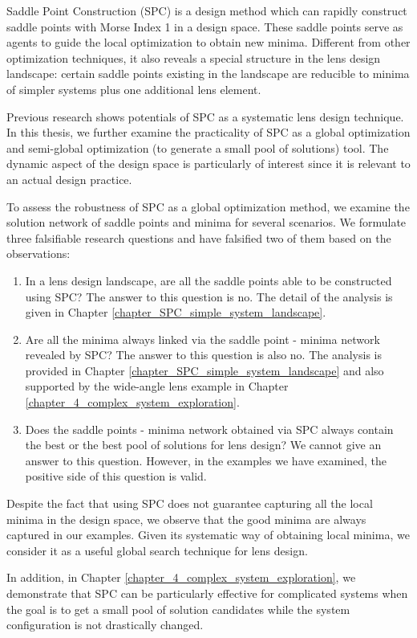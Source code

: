 Saddle Point Construction (SPC) is a design method which can rapidly construct saddle points with Morse Index 1 in a design space. These saddle points serve as agents to guide the local optimization to obtain new minima. Different from other optimization techniques, it also reveals a special structure in the lens design landscape: certain saddle points existing in the landscape are reducible to minima of simpler systems plus one additional lens element.

Previous research shows potentials of SPC as a systematic lens design technique. In this thesis, we further examine the practicality of SPC as a global optimization and semi-global optimization (to generate a small pool of solutions) tool. The dynamic aspect of the design space is particularly of interest since it is relevant to an actual design practice. 

To assess the robustness of SPC as a global optimization method, we examine the solution network of saddle points and minima for several scenarios. We formulate three falsifiable research questions and have falsified two of them based on the observations:
\begin{enumerate}[nosep]
\item In a lens design landscape, are all the saddle points able to be constructed using SPC? The answer to this question is no. The detail of the analysis is given in Chapter \ref{chapter_SPC_simple_system_landscape}.
\item Are all the minima always linked via the saddle point - minima network revealed by SPC? The answer to this question is also no. The analysis is provided in Chapter \ref{chapter_SPC_simple_system_landscape} and also supported by the wide-angle lens example in Chapter \ref{chapter_4_complex_system_exploration}.
\item Does the saddle points - minima network obtained via SPC always contain the best or the best pool of solutions for lens design? We cannot give an answer to this question. However, in the examples we have examined, the positive side of this question is valid. 
\end{enumerate}

Despite the fact that using SPC does not guarantee capturing all the local minima in the design space, we observe that the good minima are always captured in our examples. Given its systematic way of obtaining local minima, we consider it as a useful global search technique for lens design. 

In addition, in Chapter \ref{chapter_4_complex_system_exploration}, we demonstrate that SPC can be particularly effective for complicated systems when the goal is to get a small pool of solution candidates while the system configuration is not drastically changed. 


